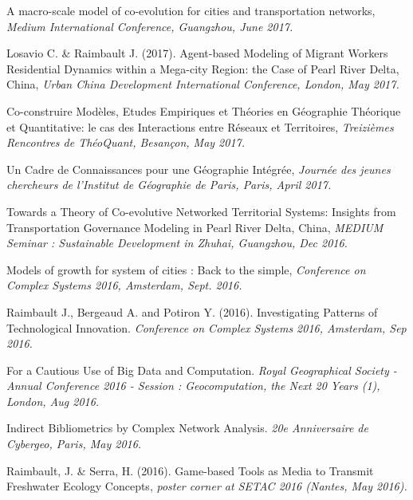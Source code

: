 \noindent A macro-scale model of co-evolution for cities and transportation networks, \textit{Medium International Conference, Guangzhou, June 2017.}


\bigskip

\noindent Losavio C. \& Raimbault J. (2017). Agent-based Modeling of Migrant Workers Residential Dynamics within a Mega-city Region: the Case of Pearl River Delta, China, \textit{Urban China Development International Conference, London, May 2017.}


\bigskip

\noindent Co-construire Modèles, Etudes Empiriques et Théories en Géographie Théorique et Quantitative: le cas des Interactions entre Réseaux et Territoires, \textit{Treizièmes Rencontres de ThéoQuant, Besançon, May 2017.}


\bigskip

\noindent Un Cadre de Connaissances pour une Géographie Intégrée,  \textit{Journée des jeunes chercheurs de l'Institut de Géographie de Paris, Paris, April 2017.}


\bigskip


\noindent Towards a Theory of Co-evolutive Networked Territorial Systems: Insights from Transportation Governance Modeling in Pearl River Delta, China, \textit{MEDIUM Seminar : Sustainable Development in Zhuhai, Guangzhou, Dec 2016.}


\bigskip


\noindent Models of growth for system of cities : Back to the simple, \textit{Conference on Complex Systems 2016, Amsterdam, Sept. 2016.}


\bigskip

\noindent Raimbault J., Bergeaud A. and Potiron Y. (2016). Investigating Patterns of Technological Innovation. \textit{Conference on Complex Systems 2016, Amsterdam, Sep 2016.}


\bigskip

\noindent For a Cautious Use of Big Data and Computation. \textit{Royal Geographical Society - Annual Conference 2016 - Session : Geocomputation, the Next 20 Years (1), London, Aug 2016.}


\bigskip

\noindent Indirect Bibliometrics by Complex Network Analysis. \textit{20e Anniversaire de Cybergeo, Paris, May 2016.}


\bigskip

\noindent Raimbault, J. \& Serra, H. (2016). Game-based Tools as Media to Transmit Freshwater Ecology Concepts, \textit{poster corner at SETAC 2016 (Nantes, May 2016).}


